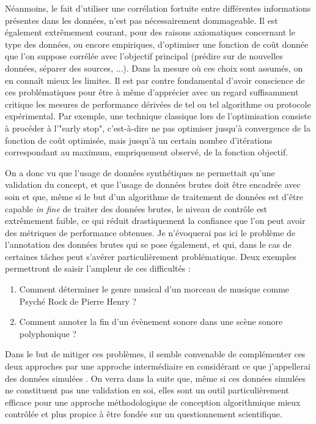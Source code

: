  Néanmoins, le fait d'utiliser une corrélation fortuite entre différentes informations présentes dans les données, n'est pas nécessairement dommageable. Il est également extrêmement courant, pour des raisons axiomatiques concernant le type des données, ou encore empiriques, d'optimiser une fonction de coût donnée que l'on suppose corrélée avec l'objectif principal (prédire sur de nouvelles données, séparer des sources, ...). Dans la mesure où ces choix sont assumés, on en connaît mieux les limites. Il est par contre fondamental d'avoir conscience de ces problématiques pour être à même d'apprécier avec un regard suffisamment critique les mesures de performance dérivées de tel ou tel algorithme ou protocole expérimental\cite{lagrangehal-01635373}. Par exemple, une technique classique lors de l'optimisation consiste à procéder à l'"early stop", c'est-à-dire ne pas optimiser jusqu'à convergence de la fonction de coût optimisée, mais jusqu'à un certain nombre d'itérations correspondant au maximum, empriquement observé, de la fonction objectif.

  On a donc vu que l'usage de données synthétiques ne permettait qu'une validation du concept, et que l'usage de données brutes doit être encadrée avec soin et que, même si le but d'un algorithme de traitement de données est d'être capable \textit{in fine} de traiter des données brutes, le niveau de contrôle est extrêmement faible, ce qui réduit drastiquement la confiance que l'on peut avoir des métriques de performance obtenues. Je n'évoquerai pas ici le problème de l'annotation des données brutes qui se pose également, et qui, dans le cas de certaines tâches peut s'avérer particulièrement problématique. Deux exemples permettront de saisir l'ampleur de ces difficultés :
  \begin{enumerate}
    \item  Comment déterminer le genre musical d'un morceau de musique comme \og Psyché Rock \fg de Pierre Henry ?
    \item Comment annoter la fin d'un évènement sonore dans une scène sonore polyphonique ?
  \end{enumerate}

  Dans le but de mitiger ces problèmes, il semble convenable de complémenter ces deux approches par une approche intermédiaire en considérant ce que j'appellerai des données \og simulées \fg. On verra dans la suite que, même si ces données simulées ne constituent pas une validation en soi, elles sont un outil particulièrement efficace pour une approche méthodologique de conception algorithmique mieux contrôlée et plus propice à être fondée sur un questionnement scientifique.


